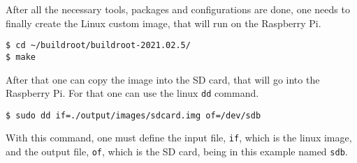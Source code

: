 After all the necessary tools, packages and configurations are done, one needs to finally create the Linux custom image, that will run on the Raspberry Pi.

\begin{lstlisting}
$ cd ~/buildroot/buildroot-2021.02.5/
$ make
\end{lstlisting}

After that one can copy the image into the SD card, that will go into the Raspberry Pi. For that one can use the linux \verb|dd| command. \cite{dd}

\begin{lstlisting}
$ sudo dd if=./output/images/sdcard.img of=/dev/sdb
\end{lstlisting}

With this command, one must define the input file, \verb|if|, which is the linux image, and the output file, \verb|of|, which is the SD card, being in this example named \verb|sdb|.
